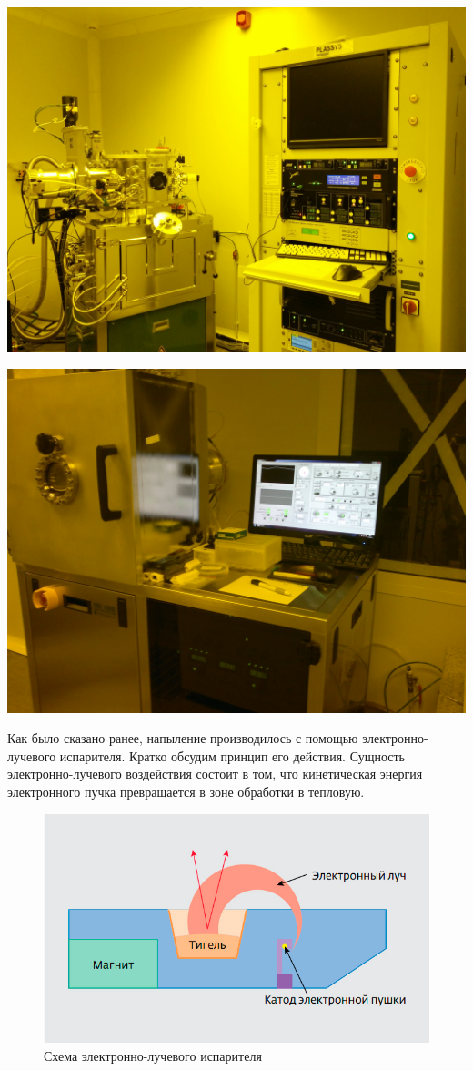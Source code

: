 \documentclass[a4paper,12pt]{article}
\begin{document}
\begin{minipage}{.49\textwidth}
  \begin{center}
 	\includegraphics[width=0.6\linewidth]{fig1}
  \end{center}
\end{minipage}
\begin{minipage}{.49\textwidth}
	\begin{center}
 		 \includegraphics[width=0.6\linewidth]{fig2}
  	\end{center}
\end{minipage}

Как было сказано ранее, напыление производилось  с помощью электронно-лучевого испарителя. Кратко обсудим принцип его действия. Сущность электронно-лучевого воздействия состоит в том, что кинетическая энергия электронного пучка превращается в зоне обработки в тепловую. 

\begin{figure} 
	\includegraphics[width=\linewidth]{fig3}
	\caption{Схема электронно-лучевого испарителя}
\end{figure}
\end{document}
